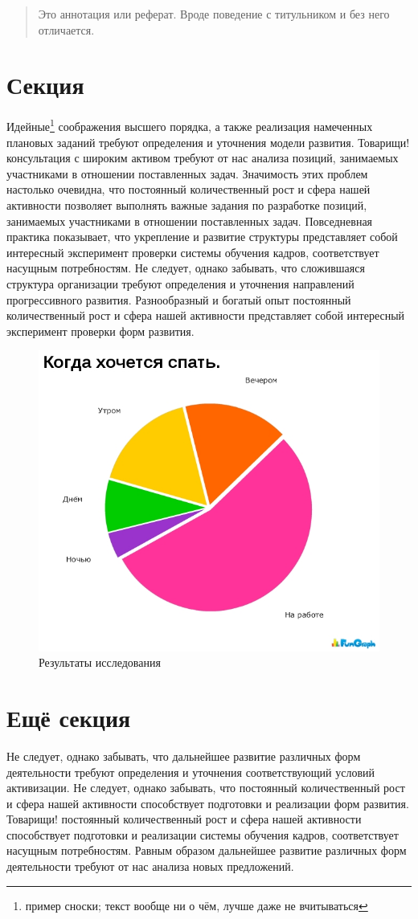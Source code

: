 \documentclass{hedsemwork}
\begin{document}
\begin{abstract}
    Это аннотация или реферат. Вроде поведение с титульником и без него
    отличается.
\end{abstract}
\section{Секция}
Идейные\footnote{пример сноски; текст вообще ни о чём, лучше даже не
вчитываться} соображения высшего порядка, а также реализация намеченных плановых заданий требуют определения и уточнения модели развития. Товарищи! консультация с широким активом требуют от нас анализа позиций, занимаемых участниками в отношении поставленных задач. Значимость этих проблем настолько очевидна, что постоянный количественный рост и сфера нашей активности позволяет выполнять важные задания по разработке позиций, занимаемых участниками в отношении поставленных задач. Повседневная практика показывает, что укрепление и развитие структуры представляет собой интересный эксперимент проверки системы обучения кадров, соответствует насущным потребностям. Не следует, однако забывать, что сложившаяся структура организации требуют определения и уточнения направлений прогрессивного развития. Разнообразный и богатый опыт постоянный количественный рост и сфера нашей активности представляет собой интересный эксперимент проверки форм развития.
\begin{figure}[t]
    \center
    \includegraphics[width=.47\textwidth]{1.jpg}
    \caption{Результаты исследования}
\end{figure}
\section{Ещё секция}
Не следует, однако забывать, что дальнейшее развитие различных форм деятельности требуют определения и уточнения соответствующий условий активизации. Не следует, однако забывать, что постоянный количественный рост и сфера нашей активности способствует подготовки и реализации форм развития. Товарищи! постоянный количественный рост и сфера нашей активности способствует подготовки и реализации системы обучения кадров, соответствует насущным потребностям. Равным образом дальнейшее развитие различных форм деятельности требуют от нас анализа новых предложений.
\end{document}
